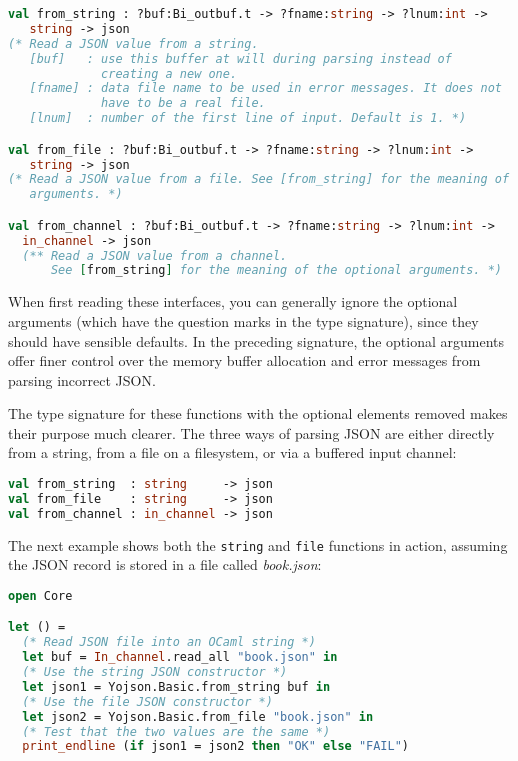 \begin{lstlisting}[language=Caml]
val from_string : ?buf:Bi_outbuf.t -> ?fname:string -> ?lnum:int ->
   string -> json
(* Read a JSON value from a string.
   [buf]   : use this buffer at will during parsing instead of
             creating a new one.
   [fname] : data file name to be used in error messages. It does not
             have to be a real file.
   [lnum]  : number of the first line of input. Default is 1. *)

val from_file : ?buf:Bi_outbuf.t -> ?fname:string -> ?lnum:int ->
   string -> json
(* Read a JSON value from a file. See [from_string] for the meaning of the optional
   arguments. *)

val from_channel : ?buf:Bi_outbuf.t -> ?fname:string -> ?lnum:int ->
  in_channel -> json
  (** Read a JSON value from a channel.
      See [from_string] for the meaning of the optional arguments. *)
\end{lstlisting}

When first reading these interfaces, you can generally ignore the
optional arguments (which have the question marks in the type
signature), since they should have sensible defaults. In the preceding
signature, the optional arguments offer finer control over the memory
buffer allocation and error messages from parsing incorrect JSON.

The type signature for these functions with the optional elements
removed makes their purpose much clearer. The three ways of parsing JSON
are either directly from a string, from a file on a filesystem, or via a
buffered input channel:

\begin{lstlisting}[language=Caml]
val from_string  : string     -> json
val from_file    : string     -> json
val from_channel : in_channel -> json
\end{lstlisting}

The next example shows both the \passthrough{\lstinline!string!} and
\passthrough{\lstinline!file!} functions in action, assuming the JSON
record is stored in a file called \emph{book.json}:

\begin{lstlisting}[language=Caml]
open Core

let () =
  (* Read JSON file into an OCaml string *)
  let buf = In_channel.read_all "book.json" in
  (* Use the string JSON constructor *)
  let json1 = Yojson.Basic.from_string buf in
  (* Use the file JSON constructor *)
  let json2 = Yojson.Basic.from_file "book.json" in
  (* Test that the two values are the same *)
  print_endline (if json1 = json2 then "OK" else "FAIL")
\end{lstlisting}

